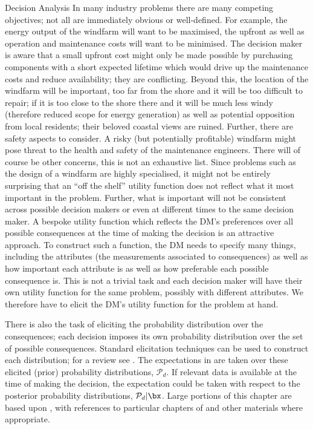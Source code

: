 \begin{chapter}{Decision Analysis \label{Ch:decision}}
In many industry problems there are many competing objectives; not all are immediately obvious or well-defined. For example, the energy output of the windfarm will want to be maximised, the upfront as well as operation and maintenance costs will want to be minimised. The decision maker is aware that a small upfront cost might only be made possible by purchasing components with a short expected lifetime which would drive up the maintenance costs and reduce availability; they are conflicting. Beyond this, the location of the windfarm will be important, too far from the shore and it will be too difficult to repair; if it is too close to the shore there and it will be much less windy (therefore reduced scope for energy generation) as well as potential opposition from local residents; their beloved coastal views are ruined. Further, there are safety aspects to consider. A risky (but potentially profitable) windfarm might pose threat to the health and safety of the maintenance engineers. There will of course be other concerns, this is not an exhaustive list. Since problems such as the design of a windfarm are highly specialised, it might not be entirely surprising that an ``off the shelf'' utility function does not reflect what it most important in the problem. Further, what is important will not be consistent across possible decision makers or even at different times to the same decision maker. A bespoke utility function which reflects the DM's preferences over all possible consequences at the time of making the decision is an attractive approach. To construct such a function, the DM needs to specify many things, including the attributes (the measurements associated to consequences) as well as how important each attribute is as well as how preferable each possible consequence is. This is not a trivial task and each decision maker will have their own utility function for the same problem, possibly with different attributes. We therefore have to elicit the DM's utility function for the problem at hand.

There is also the task of eliciting the probability distribution over the consequences; each decision imposes its own probability distribution over the set of possible consequences. Standard elicitation techniques can be used to construct each distribution; for a review see \citet{Garthwaite05,Ohagan06}. The expectations in  are taken over these elicited (prior) probability distributions, $\mathcal{P}_d$. If relevant data is available at the time of making the decision, the expectation could be taken with respect to the posterior probability distributions, $\mathcal{P}_d | \bx$. Large portions of this chapter are based upon \citep{Keeney1976,Smith2010,ElicitationBook}, with references to particular chapters of \citet{ElicitationBook} and other materials where appropriate.


\end{chapter}
